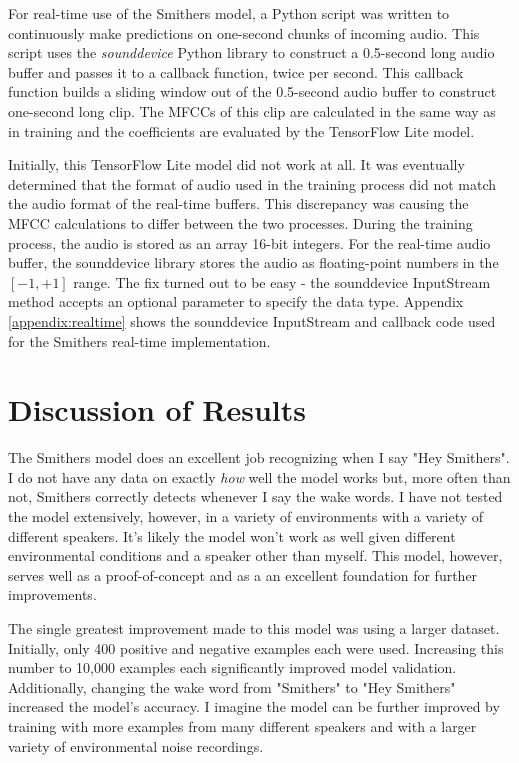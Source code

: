 \documentclass[conference]{IEEEtran}
\begin{document}
For real-time use of the Smithers model, a Python script was written
to continuously make predictions on one-second chunks of incoming audio.
This script uses the \textit{sounddevice} Python library to construct a
0.5-second long audio buffer and passes it to a callback function, twice per second.
This callback function builds a sliding window out of the 0.5-second audio buffer
to construct one-second long clip.
The MFCCs of this clip are calculated in the same way as in training
and the coefficients are evaluated by the TensorFlow Lite model.

Initially, this TensorFlow Lite model did not work at all.
It was eventually determined that the format of audio used in the training process
did not match the audio format of the real-time buffers.
This discrepancy was causing the MFCC calculations to differ between the two processes.
During the training process, the audio is stored as an array 16-bit integers.
For the real-time audio buffer, the sounddevice library stores the audio
as floating-point numbers in the $[-1,+1]$ range.
The fix turned out to be easy - the sounddevice InputStream method
accepts an optional parameter to specify the data type.
Appendix \ref{appendix:realtime} shows the sounddevice InputStream
and callback code used for the Smithers real-time implementation.


\section{Discussion of Results}

The Smithers model does an excellent job recognizing when I say "Hey Smithers".
I do not have any data on exactly \textit{how} well the model works
but, more often than not, Smithers correctly detects whenever I say the wake words.
I have not tested the model extensively, however, in a variety of environments
with a variety of different speakers.
It's likely the model won't work as well given different environmental conditions
and a speaker other than myself.
This model, however, serves well as a proof-of-concept and as a an excellent foundation
for further improvements.

The single greatest improvement made to this model was using a larger dataset.
Initially, only 400 positive and negative examples each were used.
Increasing this number to 10,000 examples each significantly improved model validation.
Additionally, changing the wake word from "Smithers" to "Hey Smithers" increased 
the model's accuracy.
I imagine the model can be further improved by training with more examples
from many different speakers and with a larger variety of environmental noise recordings.
\end{document}
